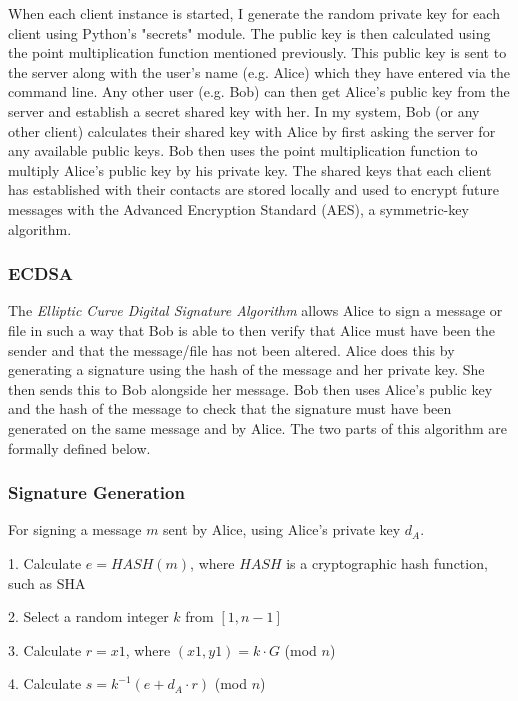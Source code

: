 \documentclass[12pt,a4paper]{article}
\begin{document}
When each client instance is started, I generate the random private key for each client using Python's "secrets" module. 
The public key is then calculated using the point multiplication function mentioned previously. 
This public key is sent to the server along with the user's name (e.g. Alice) which they have entered via the command line. 
Any other user (e.g. Bob) can then get Alice's public key from the server and establish a secret shared key with her. 
In my system, Bob (or any other client) calculates their shared key with Alice by first asking the server 
for any available public keys. 
Bob then uses the point multiplication function to multiply Alice's public key by his private key. 
The shared keys that each client has established with their contacts are stored locally 
and used to encrypt future messages with the Advanced Encryption Standard (AES), a symmetric-key algorithm. 

\subsubsection{ECDSA} \noindent \label{ECDSA}
The \emph{Elliptic Curve Digital Signature Algorithm} allows Alice to sign a message or file in such a way that Bob is able to then 
verify that Alice must have been the sender and that the message/file has not been altered. 
Alice does this by generating a signature using the hash of the message and her private key. 
She then sends this to Bob alongside her message. 
Bob then uses Alice's public key and the hash of the message to check that the signature must have been generated on the same message and by Alice. 
The two parts of this algorithm are formally defined below. 

\subsubsection{Signature Generation} \noindent \label{Signature Generation}
For signing a message $m$ sent by Alice, using Alice's private key $d_A$.

\vspace{1mm}

1. \space Calculate $e = HASH(m)$, where $HASH$ is a cryptographic hash function, such as SHA

2. \space Select a random integer $k$ from $[1,n-1]$

3. \space Calculate $r = x1$, where $(x1,y1) = k \cdot G$ (mod $n$)

4. \space Calculate $s = k^{-1}(e+d_A \cdot r)$ (mod $n$)
\end{document}
